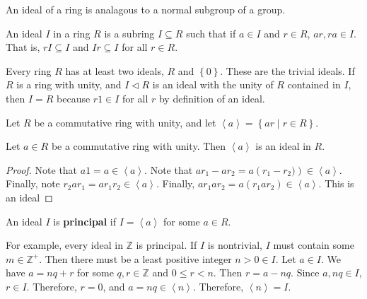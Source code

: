 An ideal of a ring is analagous to a normal subgroup of a group.
\begin{definition}[Ideal]\label{dfn:IDL}
	An ideal $I$ in a ring $R$ is a subring $I\subseteq R$ such that if $a\in I$ and $r\in R$, $ar,ra\in I$. That is, $rI\subseteq I$ and $Ir\subseteq I$ for all $r\in R$.
\end{definition}
Every ring $R$ has at least two ideals, $R$ and $\left\{ 0 \right\} $. These are the trivial ideals. If $R$ is a ring with unity, and $I\lhd  R$ is an ideal with the unity of $R$ contained in $I$, then $I=R$ because $r1\in I$ for all $r$ by definition of an ideal.
\begin{definition}\label{dfn:kjs}
	Let $R$ be a commutative ring with unity, and let $\left\langle a \right\rangle =\left\{ ar \mid r\in R \right\} $.
\end{definition}
\begin{theorem}\label{thm:kjsd}
	Let $a\in R$ be a commutative ring with unity.  Then $\left\langle a \right\rangle $ is an ideal in $R$.
\end{theorem}
\begin{proof}
	Note that $a1=a\in \left\langle a \right\rangle $. Note that $ar_1-ar_2=a\left( r_1-r_2) \right) \in \left\langle a \right\rangle $. Finally, note $r_2ar_1=ar_1r_2\in \left\langle a \right\rangle $. Finally, $ar_1ar_2=a\left( r_1ar_2 \right) \in \left\langle a \right\rangle $. This is an ideal
\end{proof}
\begin{definition}[Principal]\label{dfn:PI}
	An ideal $I$ is \textbf{principal} if $I=\left\langle a \right\rangle $ for some $a\in R$.
\end{definition}

For example, every ideal in $\mathbb{Z}$ is principal. If $I$ is nontrivial, $I$ must contain some $m\in\mathbb{Z}^+$. Then there must be a least positive integer $n>0\in I$. Let $a\in I$. We have $a=nq+r$ for some $q,r\in\mathbb{Z}$ and $0\leq r<n$. Then $r=a-nq$. Since $a,nq\in I$, $r\in I$. Therefore, $r=0$, and $a=nq\in \left\langle n \right\rangle $. Therefore, $\left\langle n \right\rangle =I$.

